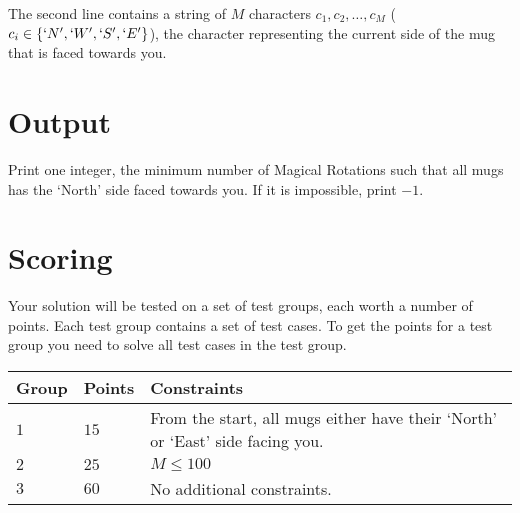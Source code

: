 The second line contains a string of $M$ characters $c_1, c_2, \dots, c_M$ ($c_i \in \{`N',`W',`S',`E'\}$), the character representing the current side of the mug that is faced towards you.

\section*{Output}
Print one integer, the minimum number of Magical Rotations such that all mugs has the `North' side faced towards you. If it is impossible, print $-1$. 

\section*{Scoring}
Your solution will be tested on a set of test groups, each worth a number of points. Each test group contains
a set of test cases. To get the points for a test group you need to solve all test cases in the test group.

\noindent
\begin{tabular}{| l | l | p{12cm} |}
  \hline
  \textbf{Group} & \textbf{Points} & \textbf{Constraints} \\ \hline
  $1$    & $15$       & From the start, all mugs either have their `North' or `East' side facing you. \\ \hline
  $2$    & $25$       & $M \leq 100$ \\ \hline
  $3$    & $60$       & No additional constraints. \\ \hline
\end{tabular}
